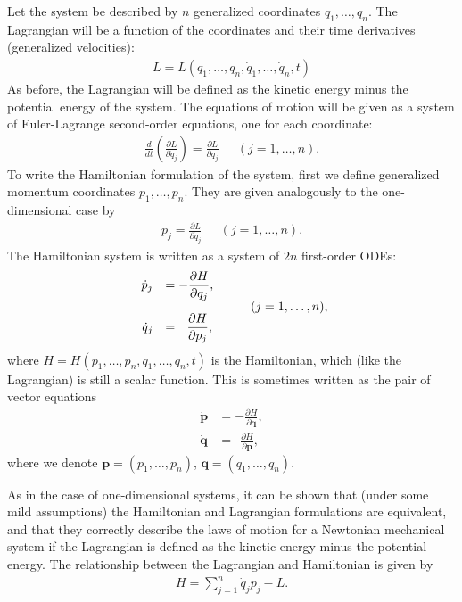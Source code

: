 \documentclass[12pt]{amsart}
\newcommand{\eqst}[1]{\begin{align*}#1\end{align*}}
\newcommand{\pder}[2]{\frac{\partial#1}{\partial#2}}
\begin{document}
Let the system be described by $n$ generalized coordinates $q_1, \ldots, q_n$. The Lagrangian will be a function of the coordinates and their time derivatives (generalized velocities):
\eqst{ L = L(q_1,\ldots,q_n,\dot{q}_1,\ldots,\dot{q}_n, t) }
As before, the Lagrangian will be defined as the kinetic energy minus the potential energy of the system. The equations of motion will be given as a system of Euler-Lagrange second-order equations, one for each coordinate:
\eqst{
\frac{d}{dt}\left( \frac{\partial L}{\partial \dot{q}_j} \right) = \frac{\partial L}{\partial q_j} \ \ \quad (j=1,\ldots,n).
}
To write the Hamiltonian formulation of the system, first we define generalized momentum coordinates $p_1,\ldots,p_n$. They are given analogously to the one-dimensional case by
\eqst{ 
p_j = \pder{L}{\dot{q}_j} \ \ \quad (j=1,\ldots,n).
}
The Hamiltonian system is written as a system of $2n$ first-order ODEs:
\eqst{ \begin{array}{rl} \displaystyle
\dot{p}_j &= \displaystyle-\frac{\partial H}{\partial q_j}, \raisebox{-20pt}{\ } \\
\displaystyle \dot{q}_j &= \displaystyle \ \ \frac{\partial H}{\partial p_j},
\end{array} \qquad (j=1,\ldots,n),
}
where $H=H(p_1,\ldots,p_n,q_1,\ldots,q_n, t)$ is the Hamiltonian, which (like the Lagrangian) is still a scalar function.
This is sometimes written as the pair of vector equations
\eqst{
\dot{\mathbf{p}} &= -\frac{\partial H}{\partial \mathbf{q}}, \\
\dot{\mathbf{q}} &= \ \ \frac{\partial H}{\partial \mathbf{p}},
}
where we denote $\mathbf{p}=(p_1,\ldots,p_n)$, $\mathbf{q}=(q_1,\ldots,q_n)$.

As in the case of one-dimensional systems, it can be shown that (under some mild assumptions) the Hamiltonian and Lagrangian formulations are equivalent, and that they correctly describe the laws of motion for a Newtonian mechanical system if the Lagrangian is defined as the kinetic energy minus the potential energy. The relationship between the Lagrangian and Hamiltonian is given by
\eqst{
H = \sum_{j=1}^n \dot{q}_j p_j - L.
}
\end{document}

